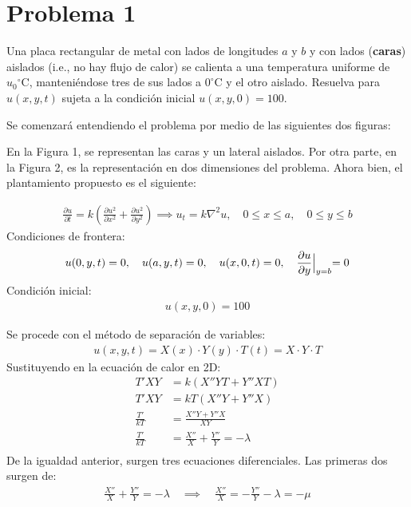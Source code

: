 \section{Problema 1}
Una placa rectangular de metal con lados de longitudes $a$ y $b$ y con lados (\textbf{caras}) aislados (i.e., no hay flujo de calor) se calienta a una temperatura uniforme de $u_{0}{ }^{\circ} \mathrm{C}$, manteniéndose
tres de sus lados a $0^{\circ} \mathrm{C}$ y el otro aislado. Resuelva para $u(x, y, t)$ sujeta a la condición inicial $u(x, y, 0)=100$.
\begin{solution}
Se comenzará entendiendo el problema por medio de las siguientes dos figuras:


En la Figura 1, se representan las caras y un lateral aislados. Por otra parte, en la Figura 2, es la representación en dos dimensiones del problema.  
Ahora bien, el plantamiento propuesto es el siguiente: 
\begin{tcolorbox}[colback=gray!15,colframe=black!1!black,title=Condiciones - Ecuación de calor en 2D]
\begin{gather*}
    \frac{\partial u}{\partial t } =  k\left(\frac{\partial u^2}{\partial x^2 }+\frac{\partial u^2}{\partial y^2 }\right)\implies u_t=k\nabla^2u, \quad 0\leq x \leq a, \quad 0\leq y \leq b
\end{gather*}
Condiciones de frontera: 
\begin{gather*}
    u(0,y,t)=0, \quad u(a,y,t)=0, \quad u( x,0,t) =0,\quad \frac{\partial u}{\partial y}\Bigl|_{y=b} =0
\end{gather*}
Condición inicial: 
\begin{gather*}
    u(x,y,0)=100
\end{gather*}
\end{tcolorbox}
Se procede con el método de separación de variables: 
\begin{gather*}
    u(x,y,t)= X(x)\cdot Y(y)\cdot T(t) = X\cdot Y \cdot T
\end{gather*}
Sustituyendo en la ecuación de calor en 2D: 
\begin{align*}
    T'XY &= k\left(X''YT+Y''XT\right)\\
    T'XY &= kT\left(X''Y+Y''X\right)\\
    \frac{T'}{kT} &= \frac{X''Y+Y''X}{XY}\\
    \frac{T'}{kT} &= \frac{X''}{X}+\frac{Y''}{Y}=-\lambda\\
\end{align*}
De la igualdad anterior, surgen tres ecuaciones diferenciales. Las primeras dos surgen de: 
\begin{gather*}
    \frac{X''}{X}+\frac{Y''}{Y} = -\lambda \quad \implies \quad  \frac{X''}{X} = -\frac{Y''}{Y} -\lambda = -\mu 
\end{gather*}


\end{solution}
